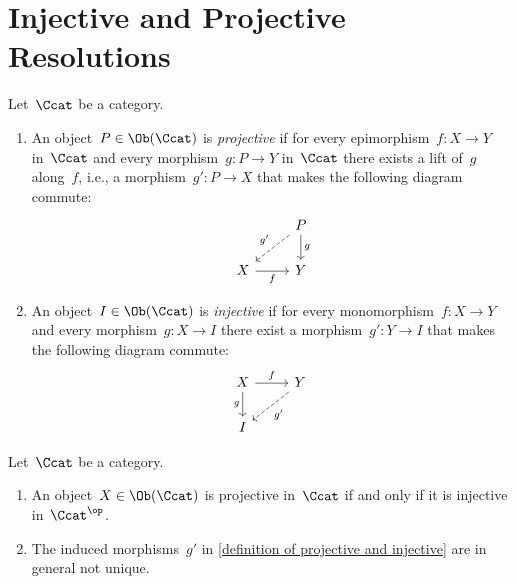 \section{Injective and Projective Resolutions}


\begin{definition}
  \label{definition of projective and injective}
  Let~$\Ccat$ be a category.
  \begin{enumerate}
    \item
      An object~$P \in \Ob(\Ccat)$ is \emph{projective} if for every epimorphism~$f \colon X \to Y$ in~$\Ccat$ and every morphism~$g \colon P \to Y$ in~$\Ccat$ there exists a lift of~$g$ along~$f$, i.e., a morphism~$g' \colon P \to X$ that makes the following diagram commute:
      \[
        \begin{tikzcd}
            {}
          & P
            \arrow{d}[right]{g}
            \arrow[dashed]{dl}[above left]{g'}
          \\
            X
            \arrow{r}[below]{f}
          & Y
        \end{tikzcd}
      \]
    \item
      An object~$I \in \Ob(\Ccat)$ is \emph{injective} if for every monomorphism~$f \colon X \to Y$ and every morphism~$g \colon X \to I$ there exist a morphism~$g' \colon Y \to I$ that makes the following diagram commute:
      \[
        \begin{tikzcd}
            X
            \arrow{r}[above]{f}
            \arrow{d}[left]{g}
          & Y
            \arrow[dashed]{dl}[below right]{g'}
          \\
            I
          & {}
        \end{tikzcd}
      \]
  \end{enumerate}
\end{definition}


\begin{remark}
  Let~$\Ccat$ be a category.
  \begin{enumerate}
    \item
      An object~$X \in \Ob(\Ccat)$ is projective in~$\Ccat$ if and only if it is injective in~$\Ccat^\op$.
    \item
      The induced morphisms~$g'$ in \cref{definition of projective and injective} are in general not unique.
  \end{enumerate}
\end{remark}


